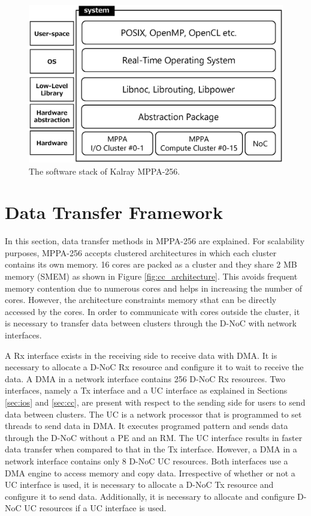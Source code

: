 \documentclass{sig-alternate-05-2015}
\begin{document}
\begin{figure}[t]
  \centering
  \includegraphics[width=1.0\linewidth]{../figure/softwarestack.eps}
  \caption{\label{fig:software_stack}
    The software stack of Kalray MPPA-256.}
\end{figure}


\section{Data Transfer Framework}
\label{sec:framework}
In this section, data transfer methods in MPPA-256 are explained.
For scalability purposes, MPPA-256 accepts clustered architectures in which each cluster contains its own memory.
16 cores are packed as a cluster and they share 2 MB memory (SMEM) as shown in Figure \ref{fig:cc_architecture}.
This avoids frequent memory contention due to numerous cores and helps in increasing the number of cores.
However, the architecture constraints memory sthat can be directly accessed by the cores.
In order to communicate with cores outside the cluster, it is necessary to transfer data between clusters through the D-NoC with network interfaces.

A Rx interface exists in the receiving side to receive data with DMA.
It is necessary to allocate a D-NoC Rx resource and configure it to wait to receive the data.
A DMA in a network interface contains 256 D-NoC Rx resources.
Two interfaces, namely a Tx interface and a UC interface as explained in Sections \ref{sec:ios} and \ref{sec:cc},
are present with respect to the sending side for users to send data between clusters.
The UC is a network processor that is programmed to set threads to send data in DMA.
It executes programed pattern and sends data through the D-NoC without a PE and an RM.
The UC interface results in faster data transfer when compared to that in the Tx interface.
However, a DMA in a network interface contains only 8 D-NoC UC resources.
Both interfaces use a DMA engine to access memory and copy data.
Irrespective of whether or not a UC interface is used, it is necessary to allocate a D-NoC Tx resource and configure it to send data.
Additionally, it is necessary to allocate and configure D-NoC UC resources if a UC interface is used.
\end{document}
